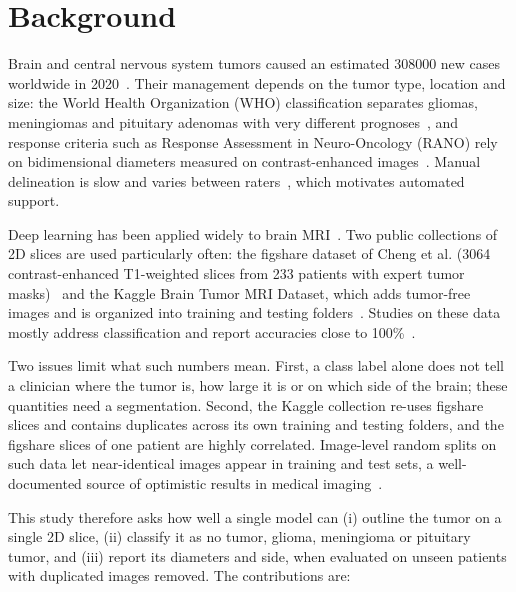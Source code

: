 \documentclass[pdflatex,sn-vancouver-num]{sn-jnl}
\begin{document}

\maketitle

\section{Background}\label{sec:background}

Brain and central nervous system tumors caused an estimated 308000 new cases worldwide in 2020~\cite{sung2021globocan}. Their management depends on the tumor type, location and size: the World Health Organization (WHO) classification separates gliomas, meningiomas and pituitary adenomas with very different prognoses~\cite{louis2021who}, and response criteria such as Response Assessment in Neuro-Oncology (RANO) rely on bidimensional diameters measured on contrast-enhanced images~\cite{wen2010rano}. Manual delineation is slow and varies between raters~\cite{menze2015}, which motivates automated support.

Deep learning has been applied widely to brain MRI~\cite{litjens2017}. Two public collections of 2D slices are used particularly often: the figshare dataset of Cheng et al. (3064 contrast-enhanced T1-weighted slices from 233 patients with expert tumor masks)~\cite{cheng2015,cheng2016,cheng2017figshare} and the Kaggle Brain Tumor MRI Dataset, which adds tumor-free images and is organized into training and testing folders~\cite{nickparvar2021kaggle}. Studies on these data mostly address classification and report accuracies close to 100\%~\cite{swati2019,deepak2019}.

Two issues limit what such numbers mean. First, a class label alone does not tell a clinician where the tumor is, how large it is or on which side of the brain; these quantities need a segmentation. Second, the Kaggle collection re-uses figshare slices and contains duplicates across its own training and testing folders, and the figshare slices of one patient are highly correlated. Image-level random splits on such data let near-identical images appear in training and test sets, a well-documented source of optimistic results in medical imaging~\cite{varoquaux2022,roberts2021}.

This study therefore asks how well a single model can (i) outline the tumor on a single 2D slice, (ii) classify it as no tumor, glioma, meningioma or pituitary tumor, and (iii) report its diameters and side, when evaluated on unseen patients with duplicated images removed. The contributions are:
\end{document}
